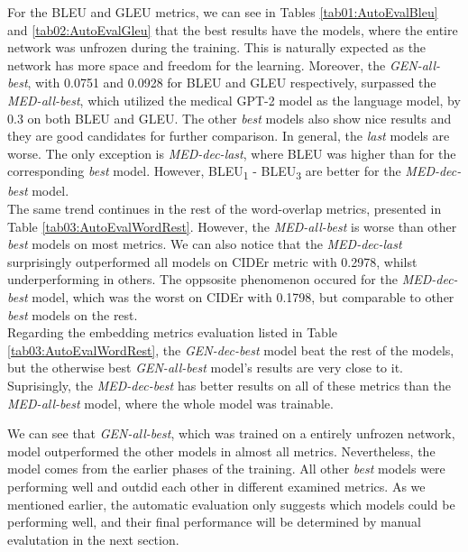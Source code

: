 For the BLEU and GLEU metrics, we can see in Tables \ref{tab01:AutoEvalBleu} and \ref{tab02:AutoEvalGleu} that the best results have the models, where the entire network was unfrozen during the training. This is naturally expected as the network has more space and freedom for the learning. Moreover, the \textit{GEN-all-best}, with 0.0751 and 0.0928 for BLEU and GLEU respectively, surpassed the \textit{MED-all-best}, which utilized the medical GPT-2 model as the language model, by 0.3 on both BLEU and GLEU. The other \textit{best} models also show nice results and they are good candidates for further comparison. In general, the \textit{last} models are worse. The only exception is \textit{MED-dec-last}, where BLEU was higher than for the corresponding \textit{best} model. However, BLEU\textsubscript{1} - BLEU\textsubscript{3} are better for the \textit{MED-dec-best} model.\\ 

The same trend continues in the rest of the word-overlap metrics, presented in Table \ref{tab03:AutoEvalWordRest}. However, the \textit{MED-all-best} is worse than other \textit{best} models on most metrics. We can also notice that the \textit{MED-dec-last} surprisingly outperformed all models on CIDEr metric with 0.2978, whilst underperforming in others. The oppsosite phenomenon occured for the \textit{MED-dec-best} model, which was the worst on CIDEr with 0.1798, but comparable to other \textit{best} models on the rest.\\

Regarding the embedding metrics evaluation listed in Table \ref{tab03:AutoEvalWordRest}, the \textit{GEN-dec-best} model beat the rest of the models, but the otherwise best \textit{GEN-all-best} model's results are very close to it. Suprisingly, the \textit{MED-dec-best} has better results on all of these metrics than the \textit{MED-all-best} model, where the whole model was trainable.\\
\newpage

We can see that \textit{GEN-all-best}, which was trained on a entirely unfrozen network, model outperformed the other models in almost all metrics. Nevertheless, the model comes from the earlier phases of the training. All other \textit{best} models were performing well and outdid each other in different examined metrics. As we mentioned earlier, the automatic evaluation only suggests which models could be performing well, and their final performance will be determined by manual evalutation in the next section.

